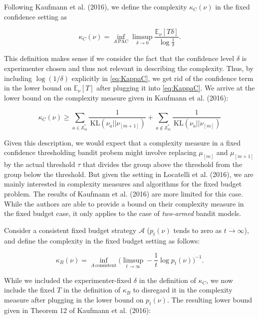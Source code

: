 \documentclass[11pt,]{article}
\newcommand{\KL}{\,\text{KL}}
\begin{document}
Following Kaufmann et al. (2016), we define the complexity
\(\kappa_C(\nu)\) in the fixed confidence setting as

\begin{equation}
\kappa_C(\nu) = \inf_{A \, \text{PAC}} \limsup_{\delta \to 0} \frac{\mathbb{E}_{\nu}[T{\delta}]}{\log \frac{1}{\delta}}. \label{eq:KappaC}
\end{equation}

This definition makes sense if we consider the fact that the confidence
level \(\delta\) is experimenter chosen and thus not relevant in
describing the complexity. Thus, by including \(\log(1/\delta)\)
explicitly in \eqref{eq:KappaC}, we get rid of the confidence term in
the lower bound on \(\mathbb{E}_{\nu}[T]\) after plugging it into
\eqref{eq:KappaC}. We arrive at the lower bound on the complexity
measure given in Kaufmann et al. (2016):

\begin{equation*}
\kappa_C(\nu) \geq \sum_{a \in \mathcal{S}_m^*} \frac{1}{\KL(\nu_a || \nu_{[m+1]})} + \sum_{a \notin \mathcal{S}_m^*} \frac{1}{\KL(\nu_a || \nu_{[m]})}
\end{equation*}

Given this description, we would expect that a complexity measure in a
fixed confidence thresholding bandit probem might involve replacing
\(\mu_{[m]}\) and \(\mu_{[m+1]}\) by the actual threshold \(\tau\) that
divides the group above the threshold from the group below the
threshold. But given the setting in Locatelli et al. (2016), we are
mainly interested in complexity measures and algorithms for the fixed
budget problem. The results of Kaufmann et al. (2016) are more limited
for this case. While the authors are able to provide a bound on their
complexity measure in the fixed budget case, it only applies to the case
of \emph{two-armed} bandit models.

Consider a consistent fixed budget strategy \(\mathcal{A}\)
(\(p_t(\nu)\) tends to zero as \(t \rightarrow \infty\)), and define the
complexity in the fixed budget setting as follows:

\begin{equation}
\kappa_B(\nu) = \inf_{A \, \text{consistent}} \big(\limsup_{t \to \infty} - \frac{1}{t} \log p_t(\nu)\big)^{-1}.
\end{equation}

While we included the experimenter-fixed \(\delta\) in the definition of
\(\kappa_C\), we now include the fixed \(T\) in the definition of
\(\kappa_B\) to disregard it in the complexity measure after plugging in
the lower bound on \(p_t(\nu)\). The resulting lower bound given in
Theorem 12 of Kaufmann et al. (2016):
\end{document}
